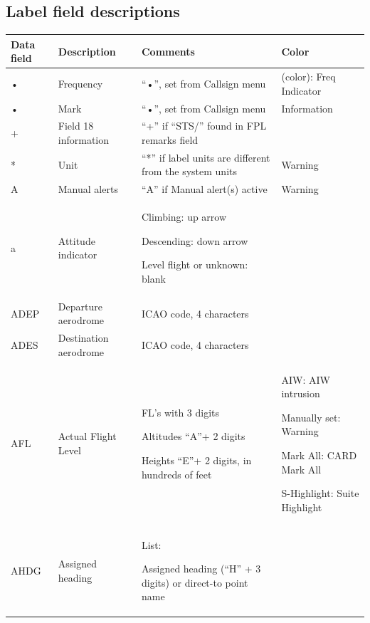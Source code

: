 \documentclass[11pt,a4paper,oldfontcommands]{memoir}
\begin{document}
\begin{landscape}
\appendix
\chapter{Label field descriptions}

\renewcommand*{\arraystretch}{1.6}
\begin{longtable}{|p{3cm}|p{4cm}|p{8cm}|p{6cm}|}
    \hline
    \bf{Data field} &
    \bf{Description} &
    \bf{Comments} &
    \bf{Color} \\ \hline
    \endhead
    • &
      Frequency &
      “•”, set from Callsign menu &
      (color): Freq Indicator \\ \hline
    • &
      Mark &
      “•”, set from Callsign menu &
      Information \\ \hline
    + &
      Field 18 information &
      “+” if “STS/” found in FPL remarks field &
       \\ \hline
    * &
      Unit &
      “*” if label units are different from  the system units &
      Warning \\ \hline
    A &
      Manual alerts &
      “A” if Manual alert(s) active &
      Warning \\ \hline
    a &
      Attitude indicator &
      Climbing: up arrow 
      
      Descending: down arrow 
      
      Level flight or unknown: blank & 
      \\ \hline
    ADEP &
      Departure aerodrome &
      ICAO code, 4 characters &
       \\ \hline
    ADES &
      Destination aerodrome &
      ICAO code, 4 characters &
       \\ \hline
    AFL &
      Actual Flight Level &
      FL’s with 3 digits

      Altitudes “A”+ 2 digits

      Heights “E”+ 2 digits, in hundreds of feet 
      
         &
      AIW: AIW intrusion 
      
      Manually set: Warning 
      
      Mark All: CARD Mark All 
      
      S-Highlight: Suite Highlight \\ \hline
    AHDG &
      Assigned heading &
      List: 
      
      Assigned heading (“H” + 3 digits) or  direct-to point name 
      \bigskip
      

\end{longtable}
\end{landscape}
\end{document}

